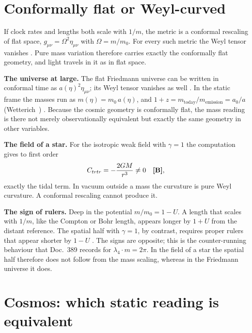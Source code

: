 \section{Conformally flat or Weyl-curved}

If clock rates and lengths both scale with $1/m$, the metric is a conformal rescaling of flat space,
$g_{\mu\nu}=\Omega^2\eta_{\mu\nu}$ with $\Omega=m/m_0$. For every such metric the Weyl tensor vanishes
\BM. Pure mass variation therefore carries exactly the conformally flat geometry, and light travels in
it as in flat space.

\textbf{The universe at large.} The flat Friedmann universe can be written in conformal time as
$a(\eta)^2\eta_{\mu\nu}$; its Weyl tensor vanishes as well \BM. In the static frame the masses run as
$m(\eta)=m_0\,a(\eta)$, and $1+z=m_{\text{today}}/m_{\text{emission}}=a_0/a$
(Wetterich~\cite{Wetterich2013}) \QM. Because the cosmic geometry is conformally flat, the mass reading
is there not merely observationally equivalent but exactly the same geometry in other variables.

\textbf{The field of a star.} For the isotropic weak field with $\gamma=1$ the computation gives to
first order
\begin{equation}
C_{trtr}=-\frac{2GM}{r^3}\neq0\quad\textbf{[B]},
\end{equation}
exactly the tidal term. In vacuum outside a mass the curvature is pure Weyl curvature. A conformal
rescaling cannot produce it.

\textbf{The sign of rulers.} Deep in the potential $m/m_0=1-U$. A length that scales with $1/m$, like
the Compton or Bohr length, appears longer by $1+U$ from the distant reference. The spatial half with
$\gamma=1$, by contrast, requires proper rulers that appear shorter by $1-U$ \BM. The signs are
opposite; this is the counter-running behaviour that Doc.~389 records for $\lambda_4\cdot m=2\pi$. In
the field of a star the spatial half therefore does not follow from the mass scaling, whereas in the
Friedmann universe it does.

\section{Cosmos: which static reading is equivalent}

